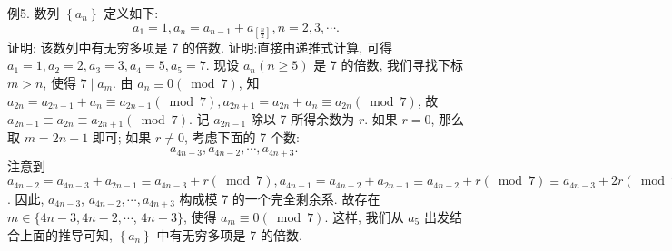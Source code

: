 例5. 数列 $\left\{a_n\right\}$ 定义如下:
$$
a_1=1, a_n=a_{n-1}+a_{\left[\frac{n}{2}\right]}, n=2,3, \cdots . 
$$
证明: 该数列中有无穷多项是 7 的倍数.
证明:直接由递推式计算, 可得 $a_1=1, a_2=2, a_3=3, a_4=5, a_5=7$.
现设 $a_n(n \geqslant 5)$ 是 7 的倍数, 我们寻找下标 $m>n$, 使得 $7 \mid a_m$.
由 $a_n \equiv 0(\bmod 7)$, 知 $a_{2 n}=a_{2 n-1}+a_n \equiv a_{2 n-1}(\bmod 7), a_{2 n+1}=a_{2 n}+a_n \equiv a_{2 n}(\bmod 7)$, 故 $a_{2 n-1} \equiv a_{2 n} \equiv a_{2 n+1}(\bmod 7)$. 记 $a_{2 n-1}$ 除以 7 所得余数为 $r$. 如果 $r=0$, 那么取 $m=2 n-1$ 即可; 如果 $r \neq 0$, 考虑下面的 7 个数:
$$
a_{4 n-3}, a_{4 n-2}, \cdots, a_{4 n+3} \text {. }
$$
注意到 $a_{4 n-2}=a_{4 n-3}+a_{2 n-1} \equiv a_{4 n-3}+r(\bmod 7), a_{4 n-1}=a_{4 n-2}+a_{2 n-1} \equiv a_{4 n-2}+r(\bmod 7) \equiv a_{4 n-3}+2 r(\bmod 7), a_{4 n}=a_{4 n-1}+a_{2 n} \equiv a_{4 n-1}+r \equiv a_{4 n-3}+ 3 r, \cdots, a_{4 n+3}=a_{4 n+2}+a_{2 n+1} \equiv a_{4 n+2}+r \equiv a_{4 n-3}+6 r(\bmod 7)$. 因此, $a_{4 n-3}$, $a_{4 n-2}, \cdots, a_{4 n+3}$ 构成模 7 的一个完全剩余系.
故存在 $m \in\{4 n-3,4 n-2, \cdots$, $4 n+3\}$, 使得 $a_m \equiv 0(\bmod 7)$.
这样, 我们从 $a_5$ 出发结合上面的推导可知, $\left\{a_n\right\}$ 中有无穷多项是 7 的倍数.



